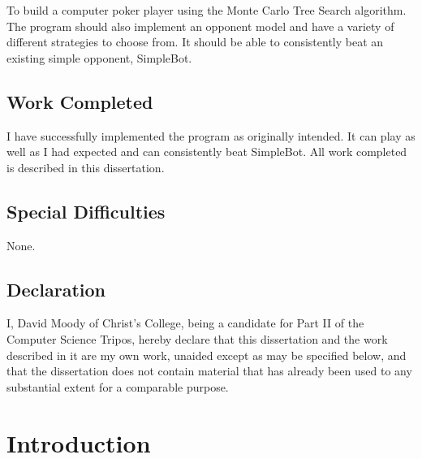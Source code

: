 \documentclass[12pt,twoside,notitlepage]{report}
\newcommand{\mcts}{Monte Carlo Tree Search\xspace}
\newcommand{\sbt}{SimpleBot\xspace}
\begin{document}
To build a computer poker player using the \mcts algorithm. The program should also implement an opponent model and have a variety of different strategies to choose from. It should be able to consistently beat an existing simple opponent, \sbt.


\section*{Work Completed}

I have successfully implemented the program as originally intended. It can play as well as I had expected and can consistently beat \sbt.
All work completed is described in this dissertation. 


\section*{Special Difficulties}

None.

 
\newpage
\section*{Declaration}

I, David Moody of Christ's College, being a candidate for Part II of the Computer Science Tripos, 
hereby declare that this dissertation and the work described in it are my own work, unaided except as may be specified below, and that the dissertation does not contain material that has already been used to any substantial extent for a comparable purpose.

\bigskip
{}

\medskip
{}

\cleardoublepage

\tableofcontents

\listoffigures




\cleardoublepage
\setcounter{page}{1}
\pagestyle{headings}


\chapter{Introduction}

\end{document}
